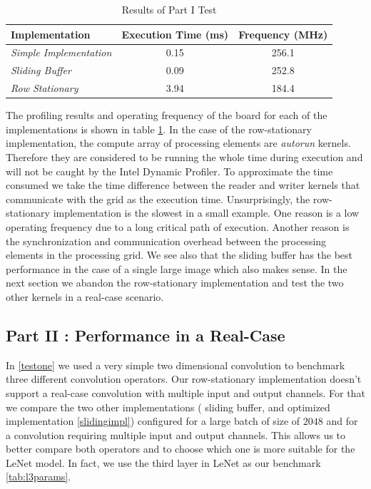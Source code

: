 \begin{table}[]
\centering
\begin{tabular}{|l|c|c|}
\hline
\textbf{Implementation}        & \multicolumn{1}{l|}{\textbf{Execution Time (ms)}} & \multicolumn{1}{l|}{Frequency (MHz)} \\ \hline
\textit{Simple Implementation} & 0.15                                              & 256.1                                \\ \hline
\textit{Sliding Buffer}        & 0.09                                              & 252.8                                \\ \hline
\textit{Row Stationary}        & 3.94                                              & 184.4                                \\ \hline
\end{tabular}
\caption{Results of Part I Test}
\label{tab:resultpartone}
\end{table}

The profiling results and operating frequency of the board for each of the implementations is shown in table \ref{tab:resultpartone}. In the case of the row-stationary implementation, the compute array of processing elements are \emph{autorun} kernels. Therefore they are considered to be running the whole time during execution and will not be caught by the Intel Dynamic Profiler. To approximate the time consumed we take the time difference between the reader and writer kernels that communicate with the grid as the execution time.
Unsurprisingly, the row-stationary implementation is the slowest in a small example. One reason is a low operating frequency due to a long critical path of execution. Another reason is the synchronization and communication overhead between the processing elements in the processing grid. We see also that the sliding buffer has the best performance in the case of a single large image which also makes sense. In the next section we abandon the row-stationary implementation and test the two other kernels in a real-case scenario.


\subsection{Part II : Performance in a Real-Case} 

In \ref{testone} we used a very simple two dimensional convolution to benchmark three different convolution operators. Our row-stationary implementation doesn't support a real-case convolution with multiple input and output channels. For that we compare the two other implementations ( sliding buffer, and optimized implementation \ref{slidingimpl}) configured for a large batch of size of $ 2048 $ and for a convolution requiring multiple input and output channels. This allows us to better compare both operators and to choose which one is more suitable for the LeNet model. In fact, we use the third layer in LeNet as our benchmark \ref{tab:l3params}.

